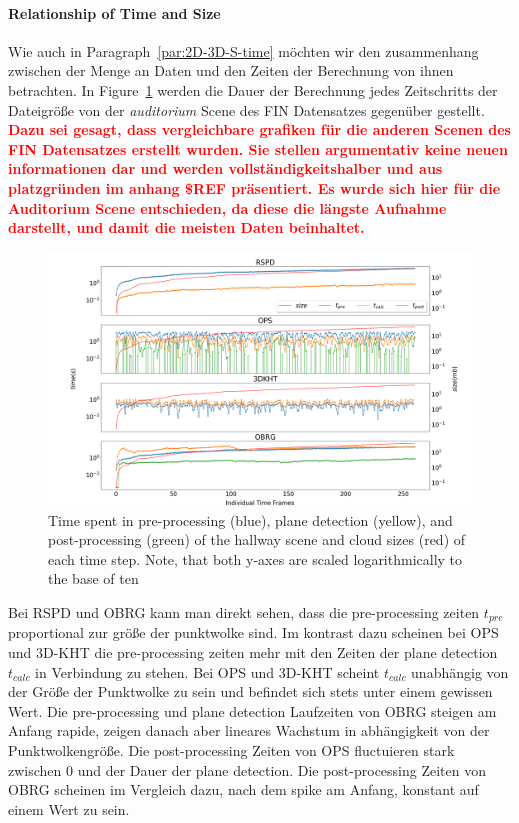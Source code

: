 \documentclass[main.tex]{subfiles}
\begin{document}
\paragraph{Relationship of Time and Size}
Wie auch in Paragraph~\ref{par:2D-3D-S-time} möchten wir den zusammenhang zwischen der Menge an Daten und den Zeiten
der Berechnung von ihnen betrachten.
In Figure~\ref{fig:dynaudi} werden die Dauer der Berechnung jedes Zeitschritts der Dateigröße von der
\textit{auditorium} Scene des FIN Datensatzes gegenüber gestellt. \textbf{\textcolor{red}{Dazu sei gesagt, dass vergleichbare grafiken
        für die anderen Scenen des FIN Datensatzes erstellt wurden. Sie stellen argumentativ keine neuen informationen dar und werden
        vollständigkeitshalber und aus platzgründen im anhang \$REF präsentiert. Es wurde sich hier für die Auditorium Scene
        entschieden, da diese die längste Aufnahme darstellt, und damit die meisten Daten beinhaltet.}}

\begin{figure}[H]
    \centering
    \includegraphics[width=\textwidth]{images/dyn_time-audi.png}
    \caption[Time Results Hallway]{Time spent in pre-processing (blue), plane detection (yellow), and post-processing
        (green) of the hallway scene and cloud sizes (red) of each time step. Note, that both y-axes are scaled
        logarithmically to the base of ten}
    \label{fig:dynaudi}
\end{figure}


Bei RSPD und OBRG kann man direkt sehen, dass die pre-processing zeiten $t_{pre}$ proportional zur größe der punktwolke
sind. Im kontrast dazu scheinen bei OPS und 3D-KHT die pre-processing zeiten mehr mit den Zeiten der plane detection
$t_{calc}$ in Verbindung zu stehen. Bei OPS und 3D-KHT scheint $t_{calc}$ unabhängig von der Größe der Punktwolke
zu sein und befindet sich stets unter einem gewissen Wert. Die pre-processing und plane detection Laufzeiten von OBRG steigen am Anfang rapide,
zeigen danach aber lineares Wachstum in abhängigkeit von der Punktwolkengröße.
Die post-processing Zeiten von OPS fluctuieren stark zwischen 0 und der Dauer der plane detection. Die 
post-processing Zeiten von OBRG scheinen im Vergleich dazu, nach dem spike am Anfang, konstant auf 
einem Wert zu sein.
\end{document}
